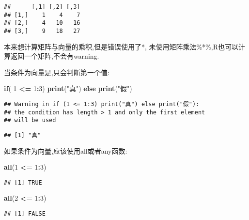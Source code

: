 \documentclass[]{ctexbook}
\newenvironment{Shaded}{\begin{snugshade}}{\end{snugshade}}
\newcommand{\ControlFlowTok}[1]{\textcolor[rgb]{0.13,0.29,0.53}{\textbf{#1}}}
\newcommand{\DecValTok}[1]{\textcolor[rgb]{0.00,0.00,0.81}{#1}}
\newcommand{\KeywordTok}[1]{\textcolor[rgb]{0.13,0.29,0.53}{\textbf{#1}}}
\newcommand{\NormalTok}[1]{#1}
\newcommand{\OperatorTok}[1]{\textcolor[rgb]{0.81,0.36,0.00}{\textbf{#1}}}
\newcommand{\StringTok}[1]{\textcolor[rgb]{0.31,0.60,0.02}{#1}}
\begin{document}
\begin{verbatim}
##      [,1] [,2] [,3]
## [1,]    1    4    7
## [2,]    4   10   16
## [3,]    9   18   27
\end{verbatim}

本来想计算矩阵与向量的乘积,但是错误使用了*,
未使用矩阵乘法\%*\%,R也可以计算返回一个矩阵,不会有warning.

当条件为向量是,只会判断第一个值:

\begin{Shaded}
\begin{Highlighting}[]
\ControlFlowTok{if}\NormalTok{( }\DecValTok{1} \OperatorTok{<=}\StringTok{ }\DecValTok{1}\OperatorTok{:}\DecValTok{3}\NormalTok{) }\KeywordTok{print}\NormalTok{(}\StringTok{"真"}\NormalTok{)  }\ControlFlowTok{else} \KeywordTok{print}\NormalTok{(}\StringTok{"假"}\NormalTok{)}
\end{Highlighting}
\end{Shaded}

\begin{verbatim}
## Warning in if (1 <= 1:3) print("真") else print("假"):
## the condition has length > 1 and only the first element
## will be used
\end{verbatim}

\begin{verbatim}
## [1] "真"
\end{verbatim}

如果条件为向量,应该使用all或者any函数:

\begin{Shaded}
\begin{Highlighting}[]
\KeywordTok{all}\NormalTok{(}\DecValTok{1} \OperatorTok{<=}\StringTok{ }\DecValTok{1}\OperatorTok{:}\DecValTok{3}\NormalTok{)}
\end{Highlighting}
\end{Shaded}

\begin{verbatim}
## [1] TRUE
\end{verbatim}

\begin{Shaded}
\begin{Highlighting}[]
\KeywordTok{all}\NormalTok{(}\DecValTok{2} \OperatorTok{<=}\StringTok{ }\DecValTok{1}\OperatorTok{:}\DecValTok{3}\NormalTok{)}
\end{Highlighting}
\end{Shaded}

\begin{verbatim}
## [1] FALSE
\end{verbatim}
\end{document}
